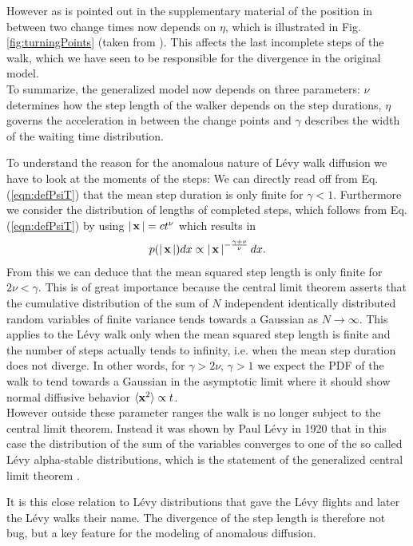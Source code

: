 However as is pointed out in the supplementary material of \cite{radons2018} the position in between two change times now depends on $\eta$, which is  illustrated in Fig. \ref{fig:turningPoints} (taken from \cite{bothe}). This affects the last incomplete steps of the walk, which we have seen to be responsible for the divergence in the original model. \\
To summarize, the generalized model now depends on three parameters: $\nu$ determines how the step length of the walker depends on the step durations, $\eta$ governs the acceleration in between the change points and $\gamma$ describes the width of the waiting time distribution. \\

{\color{blue}
To understand the reason for the anomalous nature of L\'evy walk diffusion we have to look at the moments of the steps: We can directly read off from Eq. (\ref{eqn:defPsiT}) that the mean step duration is only finite for $\gamma<1$. Furthermore we consider the distribution of lengths of completed steps, which follows from Eq. (\ref{eqn:defPsiT}) by using $\left|\,\mathbf{ x }\,\right| = c t^{\nu}$ which results in
%
\begin{align}
p(\left|\,\mathbf{ x }\,\right|) dx \propto \left|\,\mathbf{ x }\,\right|^{-\frac{\gamma+\nu}{\nu}} dx .
\end{align}
%
From this we can deduce that the mean squared step length is only finite for $2\nu < \gamma$. This is of great importance because the central limit theorem asserts that the cumulative distribution of the sum of $N$ independent identically distributed random variables of finite variance tends towards a Gaussian as $N \to \infty$. This applies to the L\'evy walk only when the mean squared step length is finite and the number of steps actually tends to infinity, i.e. when the mean step duration does not diverge. In other words, for $\gamma > 2 \nu$, $\gamma >1$ we expect the \gls{PDF} of the walk to tend towards a Gaussian in the asymptotic limit where it should show normal diffusive behavior $\langle \mathbf{ x }^2 \rangle \propto t$. \\
However outside these parameter ranges the walk is no longer subject to the central limit theorem. Instead it was shown by Paul L\'evy in 1920 that in this case the distribution of the sum of the variables converges to one of the so called L\'evy alpha-stable distributions, which  is the statement of the generalized central limit theorem \cite{lwreview}.  

It is this close relation to L\'evy distributions that gave the L\'evy flights and later the L\'evy walks their name. The divergence of the step length is therefore not bug, but a key feature for the modeling of anomalous diffusion. \\  

}
